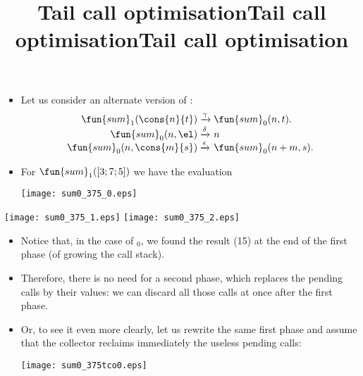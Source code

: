 \documentclass[wide]{slides}
\begin{document}
\begin{slide}
  \title{Tail call optimisation}

  \begin{itemize}

    \item Let us consider an alternate version of :
      \begin{equation*}
        \begin{array}{@{}r@{\;}l@{\;}l@{}}
          \fun{sum}_1(\cons{n}{t}) & \xrightarrow{\gamma}
          & \fun{sum}_0(n,t).\\
          \fun{sum}_0(n,\el) & \xrightarrow{\delta} & n\\
          \fun{sum}_0(n,\cons{m}{s}) & \xrightarrow{\epsilon}
          & \fun{sum}_0(n+m,s).
        \end{array}
      \end{equation*}

    \item For \(\fun{sum}_1([3;7;5])\) we have the evaluation
      \begin{center}
        \texttt{[image: sum0\_375\_0.eps]}
      \end{center}

  \end{itemize}

\end{slide}

\begin{slide}
  \title{Tail call optimisation}

  \begin{center}
    \texttt{[image: sum0\_375\_1.eps]}
    \texttt{[image: sum0\_375\_2.eps]}
  \end{center}

\end{slide}

\begin{slide}
  \title{Tail call optimisation}

  \begin{itemize}

    \item Notice that, in the case of $_0$, we found the
      result (15) at the end of the first phase (of growing the call
      stack).

    \item Therefore, there is no need for a second phase, which
      replaces the pending calls by their values: we can discard all
      those calls at once after the first phase.

    \item Or, to see it even more clearly, let us rewrite the same
      first phase and assume that the collector reclaims immediately
      the useless pending calls:
      \begin{center}
        \texttt{[image: sum0\_375tco0.eps]}
      \end{center}

  \end{itemize}

\end{slide}
\end{document}
